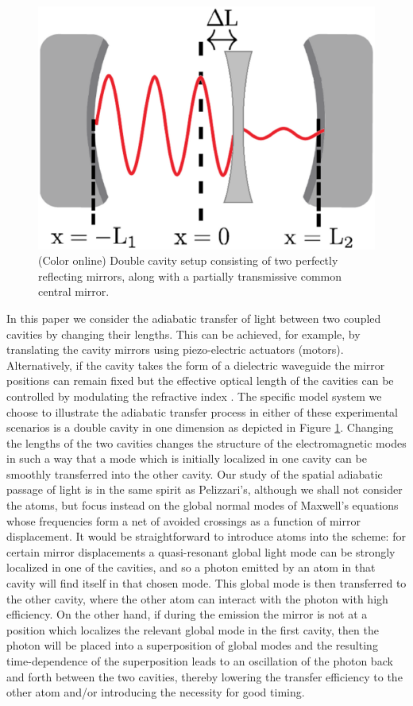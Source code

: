 \documentclass[twocolumn,english,pra,aps,superscriptaddress,floatfix]{revtex4-1}
\begin{document}
\begin{figure}
\includegraphics[width=0.9\columnwidth]{CavitySetupnew}
\caption{(Color online) Double cavity setup consisting
of two perfectly reflecting mirrors, along with a partially transmissive common central mirror.}
\label{fig:cavitysetup}
\end{figure}


In this paper we consider the adiabatic transfer of light between two coupled cavities by changing their lengths. This can be achieved, for example, by translating the cavity mirrors using piezo-electric actuators (motors). Alternatively, if the cavity takes the form of a dielectric waveguide the mirror positions can remain fixed but the effective optical length of the cavities can be controlled by modulating the refractive index \cite{preble07}.  The specific model system we choose to illustrate the adiabatic transfer process in either of these experimental scenarios is a double cavity in one dimension as depicted in Figure \ref{fig:cavitysetup}. Changing the lengths of the two cavities changes the structure of the electromagnetic modes in such a way that a mode which is initially localized in one cavity can be smoothly transferred into the other cavity.  Our study of the spatial adiabatic passage of light is in the same spirit as Pelizzari's, although we shall not consider the atoms, but focus instead on the global normal modes of Maxwell's equations whose frequencies form a net of avoided crossings as a function of mirror displacement. It would be straightforward to introduce atoms into the scheme: for certain mirror displacements a quasi-resonant global light mode can be strongly localized in one of the cavities, and so a photon emitted by an atom in that cavity will find itself in that chosen mode. This global mode is then transferred to the other cavity, where the other atom can interact with the photon with high efficiency. On the other hand, if during the emission the mirror is not at a position which localizes the relevant global mode in the first cavity, then the photon will be placed into a superposition of global modes and the resulting time-dependence of the superposition leads to an oscillation of the photon back and forth between the two cavities, thereby lowering the transfer efficiency to the other atom and/or introducing the necessity for good timing.
\end{document}
